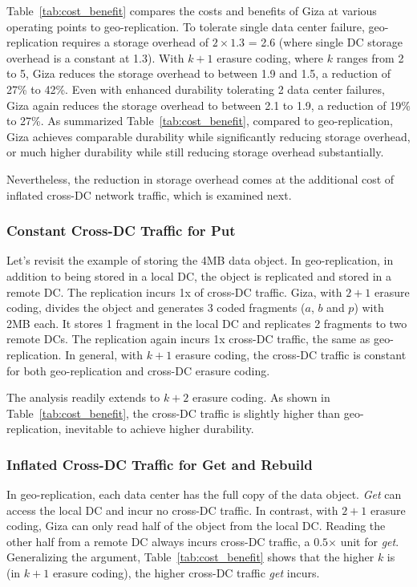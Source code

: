 Table~\ref{tab:cost_benefit} compares the costs and benefits of Giza at various operating points to geo-replication.
To tolerate single data center failure, geo-replication requires a storage overhead of $2\times1.3$ = 2.6 (where single DC storage overhead is a constant at 1.3). With $k+1$ erasure coding, where $k$ ranges from 2 to 5, Giza reduces the storage overhead to between 1.9 and 1.5, a reduction of 27\% to 42\%. Even with enhanced durability tolerating 2 data center failures, Giza again reduces the storage overhead to between 2.1 to 1.9, a reduction of 19\% to 27\%. As summarized Table~\ref{tab:cost_benefit}, compared to geo-replication, Giza achieves comparable durability while significantly reducing storage overhead, or much higher durability while still reducing storage overhead substantially.

Nevertheless, the reduction in storage overhead comes at the additional cost of inflated cross-DC network traffic, which is examined next.

\subsubsection{Constant Cross-DC Traffic for Put}

Let's revisit the example of storing the 4MB data object. In geo-replication, in addition to being stored in a local DC, the object is replicated and stored in a remote DC. The replication incurs 1x of cross-DC traffic. Giza, with $2 + 1$ erasure coding, divides the object  and generates 3 coded fragments ($a$, $b$ and $p$) with 2MB each. It stores 1 fragment in the local DC and replicates 2 fragments to two remote DCs. The replication again incurs 1x cross-DC traffic, the same as geo-replication. In general, with $k+1$ erasure coding, the cross-DC traffic is constant for both geo-replication and cross-DC erasure coding.

The analysis readily extends to $k+2$ erasure coding. As shown in Table~\ref{tab:cost_benefit}, the cross-DC traffic is slightly higher than geo-replication, inevitable to achieve higher durability.

\subsubsection{Inflated Cross-DC Traffic for Get and Rebuild}

In geo-replication, each data center has the full copy of the data object. {\em Get} can access the local DC and incur no cross-DC traffic. In contrast, with $2+1$ erasure coding, Giza can only read half of the object from the local DC. Reading the other half from a remote DC always incurs cross-DC traffic, a $0.5$$\times$ unit for {\em get}. Generalizing the argument, Table~\ref{tab:cost_benefit} shows that the higher $k$ is (in $k+1$ erasure coding), the higher cross-DC traffic {\em get} incurs.

